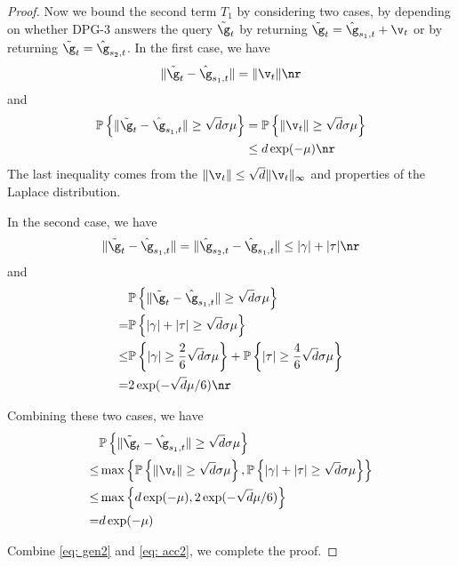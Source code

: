 \begin{proof}
Now we bound the second term $T_1$ by considering two cases, by depending on whether DPG-3 answers the query $\tilde \g_t$ by 
returning $\tilde \g_t = \hat \g_{s_1,t} + \v_t$ or by returning $\tilde \g_t = \hat \g_{s_2,t}$. In the first case, we have 
\begin{equation}
    \|\tilde \g_t - \hat \g_{s_1,t}\| = \|\v_t\| \nr
\end{equation}
and
\begin{equation}
\begin{split}
    \mathbb{P}\left\{ \|\tilde \g_t - \hat \g_{s_1,t}\| \geq \sqrt{d}\sigma \mu  \right\} 
    &= \mathbb{P} \left\{ \|\v_t\| \geq  \sqrt{d}\sigma \mu \right\} \\
    &\leq d \exp(-\mu) \nr
\end{split}
\end{equation}
The last inequality comes from the $\|\v_t\| \leq \sqrt{d}\|\v_t\|_\infty$ and properties of the Laplace distribution. 

In the second case, we have 
\begin{equation}
    \|\tilde \g_t - \hat \g_{s_1,t} \| = \| \hat \g_{s_2,t} -\hat \g_{s_1,t} \| \leq |\gamma| + |\tau| \nr
\end{equation}
and 
\begin{equation}
\begin{split}
&\mathbb{P} \left\{ \|\tilde \g_t - \hat \g_{s_1,t}\| \geq \sqrt{d}\sigma \mu  \right\}\\ =& \mathbb{P} \left\{ |\gamma| + |\tau| 
 \geq   \sqrt{d}\sigma \mu \right\} \\ 
 \leq&
  \mathbb{P} \left\{ |\gamma|  \geq   \frac{2}{6}\sqrt{d}\sigma \mu \right\} +  \mathbb{P} \left\{ |\tau|  \geq   \frac{4}{6}\sqrt{d}\sigma \mu \right\} \\
 =& 2\exp(-\sqrt{d}\mu /6) \nr
\end{split}
\end{equation}

Combining these two cases, we have
\begin{align}\notag 
&\mathbb{P} 
\left\{ \|\tilde \g_t - \hat \g_{s_1,t}\| \geq \sqrt{d}\sigma \mu  \right\} 
 \\ \notag
\leq& \max \left\{ 
\mathbb{P} \left\{ \|\v_t\| \geq  \sqrt{d}\sigma \mu \right\}, 
\mathbb{P} \left\{ |\gamma| + |\tau|
 \geq   \sqrt{d}\sigma \mu \right\}
\right\} \\\notag 
\leq& \max \left\{ d\exp(-\mu), 2\exp(-\sqrt{d}\mu /6) \right\} \\\label{eq: acc2}
=& d\exp(-\mu)
\end{align}

Combine \eqref{eq: gen2} and \eqref{eq: acc2}, we complete the proof.

\end{proof}

